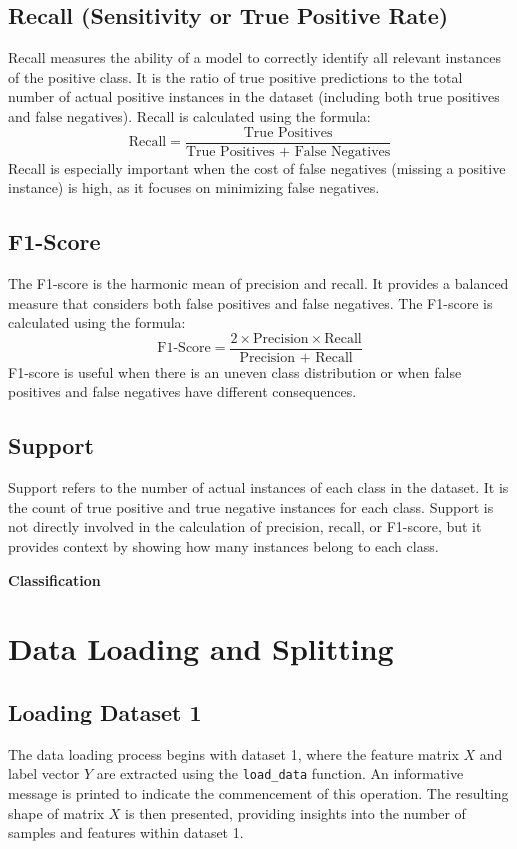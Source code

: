 \documentclass{article}
\begin{document}
\begin{titlepage}
  \subsection{Recall (Sensitivity or True Positive Rate)}
  Recall measures the ability of a model to correctly identify all relevant instances of the positive class. It is the ratio of true positive predictions to the total number of actual positive instances in the dataset (including both true positives and false negatives). Recall is calculated using the formula:
  \[
    \text{Recall} = \frac{\text{True Positives}}{\text{True Positives + False Negatives}}
  \]
  Recall is especially important when the cost of false negatives (missing a positive instance) is high, as it focuses on minimizing false negatives.

  \subsection{F1-Score}
  The F1-score is the harmonic mean of precision and recall. It provides a balanced measure that considers both false positives and false negatives. The F1-score is calculated using the formula:
  \[
    \text{F1-Score} = \frac{2 \times \text{Precision} \times \text{Recall}}{\text{Precision + Recall}}
  \]
  F1-score is useful when there is an uneven class distribution or when false positives and false negatives have different consequences.

  \subsection{Support}
  Support refers to the number of actual instances of each class in the dataset. It is the count of true positive and true negative instances for each class. Support is not directly involved in the calculation of precision, recall, or F1-score, but it provides context by showing how many instances belong to each class.

  \begin{center}
    {\Huge\bfseries Classification\par}
  \end{center}
  \vspace{2cm}

  \section{Data Loading and Splitting}

  \subsection{Loading Dataset 1}
  The data loading process begins with dataset 1, where the feature matrix \(X\) and label vector \(Y\) are extracted using the \texttt{load\_data} function. An informative message is printed to indicate the commencement of this operation. The resulting shape of matrix \(X\) is then presented, providing insights into the number of samples and features within dataset 1.


\end{titlepage}
\end{document}
